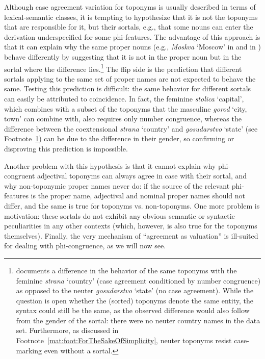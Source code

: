 \documentclass[output=paper,colorlinks,citecolor=brown]{langscibook}
\begin{document}
Although case agreement variation for toponyms is usually described in terms of lexical-semantic classes, it is tempting to hypothesize that it is not the toponyms that are responsible for it, but their sortals, e.g., that some nouns can enter the derivation underspecified for some phi-features. The advantage of this approach is that it can explain why the same proper nouns (e.g., \textit{Moskva} ‘Moscow’ in  and in ) behave differently by suggesting that it is not in the proper noun but in the sortal where the difference lies.\footnote{\label{mat:foot:Logvinova2018documents}\citet{Logvinova2018} documents a difference in the behavior of the same toponyms with the feminine \textit{strana} ‘country’ (case agreement conditioned by number congruence) as opposed to the neuter \textit{gosudarstvo} ‘state’ (no case agreement). While the question is open whether the (sorted) toponyms denote the same entity, the syntax could still be the same, as the observed difference would also follow from the gender of the sortal: there were no neuter country names in the data set. Furthermore, as discussed in Footnote~\ref{mat:foot:ForTheSakeOfSimplicity}, neuter toponyms resist case-marking even without a sortal.} The flip side is the prediction that different sortals applying to the same set of proper names are not expected to behave the same. Testing this prediction is difficult: the same behavior for different sortals can easily be attributed to coincidence. In fact, the feminine \textit{stolica} ‘capital’, which combines with a subset of the toponyms that the masculine \textit{gorod} ‘city, town’ can combine with, also requires only number congruence, whereas the difference between the coextensional \textit{strana} ‘country’ and \textit{gosudarstvo} ‘state’ (see Footnote~\ref{mat:foot:Logvinova2018documents}) can be due to the difference in their gender, so confirming or disproving this prediction is impossible.

Another problem with this hypothesis is that it cannot explain why phi-con\-gru\-ent adjectival toponyms can always agree in case with their sortal, and why non-toponymic proper names never do: if the source of the relevant phi-features is the proper name, adjectival and nominal proper names should not differ, and the same is true for toponyms vs. non-toponyms. One more problem is motivation: these sortals do not exhibit any obvious semantic or syntactic peculiarities in any other contexts (which, however, is also true for the toponyms themselves). Finally, the very mechanism of “agreement as valuation” is ill-suited for dealing with phi-congruence, as we will now see.
\end{document}
